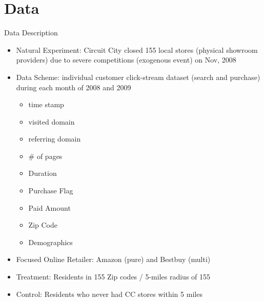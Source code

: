 \documentclass[mathserif, xcolor=table]{beamer}
\begin{document}
\section{Data}
\begin{frame}{Data Description}
	\begin{itemize}
		\item Natural Experiment: Circuit City closed 155 local stores (physical showroom providers) due to severe competitions (exogenous event) on Nov, 2008
		\item Data Scheme: individual customer click-stream dataset (search and purchase) during each month of 2008 and 2009
		\begin{multicols}{3}
			\begin{itemize}
				\item time stamp
				\item visited domain 
				\item referring domain
				\item \# of pages
				\item Duration
				\item Purchase Flag
				\item Paid Amount
				\item Zip Code
				\item Demographics
			\end{itemize}
		\end{multicols}
		\item Focused Online Retailer: Amazon (pure) and Bestbuy (multi)
		\item Treatment: Residents in 155 Zip codes / 5-miles radius of 155
		\item Control: Residents who never had CC stores within 5 miles 
	\end{itemize}
\end{frame}
\end{document}
